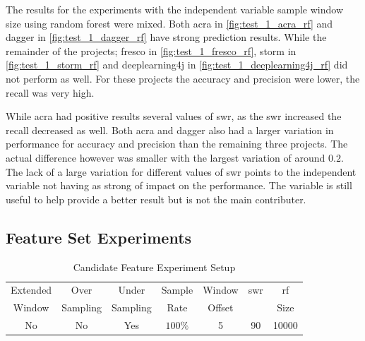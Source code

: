 The results for the experiments with the independent variable sample window size using random forest were mixed. Both acra in \autoref{fig:test_1_acra_rf} and dagger in \autoref{fig:test_1_dagger_rf} have strong prediction results. While the remainder of the projects; fresco in \autoref{fig:test_1_fresco_rf}, storm in \autoref{fig:test_1_storm_rf} and deeplearning4j in \autoref{fig:test_1_deeplearning4j_rf} did not perform as well. For these projects the accuracy and precision were lower, the recall was very high.

While acra had positive results several values of \gls{swr}, as the \gls{swr} increased the recall decreased as well. Both acra and dagger also had a larger variation in performance for accuracy and precision than the remaining three projects. The actual difference however was smaller with the largest variation of around $0.2$. The lack of a large variation for different values of \gls{swr} points to the independent variable not having as strong of impact on the performance. The variable is still useful to help provide a better result but is not the main contributer.

\subsection{Feature Set Experiments}

\begin{table}[h]
\begin{center}

    \begin{tabular}{|c|c|c|c|c|c|c|}
        \hline
        Extended & Over & Under & Sample & Window & \gls{swr} & \gls{rf} \\
        Window & Sampling & Sampling & Rate & Offset &  & Size \\ \hline
        No & No & Yes & $100\%$ & 5 & 90 & 10000 \\ \hline
    \end{tabular}
    \caption{Candidate Feature Experiment Setup}
    \label{tab:rf_feature_experiment_setup}
\end{center}

\end{table}


